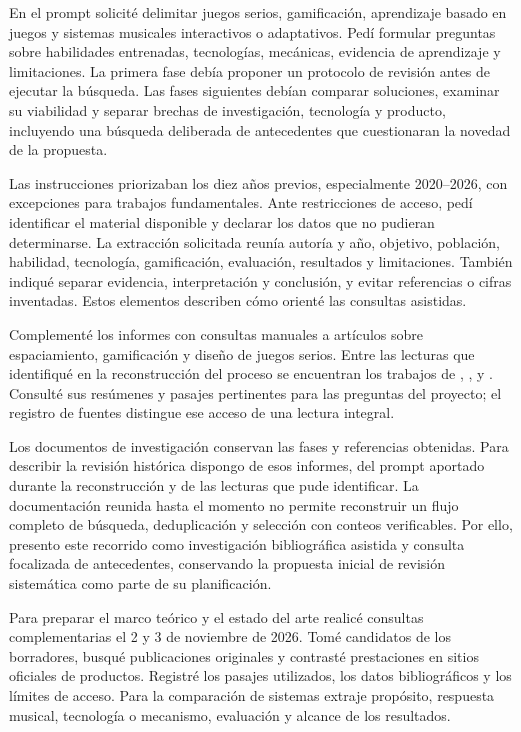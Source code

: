 En el prompt solicité delimitar juegos serios, gamificación, aprendizaje basado
en juegos y sistemas musicales interactivos o adaptativos. Pedí formular preguntas
sobre habilidades entrenadas, tecnologías, mecánicas, evidencia de aprendizaje y
limitaciones. La primera fase debía proponer un protocolo de revisión antes de
ejecutar la búsqueda. Las fases siguientes debían comparar soluciones, examinar
su viabilidad y separar brechas de investigación, tecnología y producto, incluyendo
una búsqueda deliberada de antecedentes que cuestionaran la novedad de la propuesta.

Las instrucciones priorizaban los diez años previos, especialmente 2020--2026,
con excepciones para trabajos fundamentales. Ante restricciones de acceso, pedí
identificar el material disponible y declarar los datos que no pudieran determinarse.
La extracción solicitada reunía autoría y año, objetivo, población, habilidad,
tecnología, gamificación, evaluación, resultados y limitaciones. También indiqué
separar evidencia, interpretación y conclusión, y evitar referencias o cifras
inventadas. Estos elementos describen cómo orienté las consultas asistidas.

Complementé los informes con consultas manuales a artículos sobre espaciamiento,
gamificación y diseño de juegos serios. Entre las lecturas que identifiqué en la
reconstrucción del proceso se encuentran los trabajos de
\textcite{yuan2022spacing}, \textcite{lieder2024behavior},
\textcite{sailer2017motivates} y \textcite{bellotti2010designing}.
Consulté sus resúmenes y pasajes pertinentes para las preguntas del proyecto;
el registro de fuentes distingue ese acceso de una lectura integral.

Los documentos de investigación conservan las fases y referencias obtenidas.
Para describir la revisión histórica dispongo de esos informes, del prompt
aportado durante la reconstrucción y de las lecturas que pude identificar.
La documentación reunida hasta el momento no permite reconstruir un flujo
completo de búsqueda, deduplicación y selección con conteos verificables. Por
ello, presento este recorrido como investigación bibliográfica asistida y
consulta focalizada de antecedentes, conservando la propuesta inicial de revisión
sistemática como parte de su planificación.

Para preparar el marco teórico y el estado del arte realicé consultas
complementarias el 2 y 3 de noviembre de 2026. Tomé candidatos de los borradores,
busqué publicaciones originales y contrasté prestaciones en sitios oficiales de
productos. Registré los pasajes utilizados, los datos bibliográficos y los límites
de acceso. Para la comparación de sistemas extraje propósito, respuesta musical,
tecnología o mecanismo, evaluación y alcance de los resultados.

